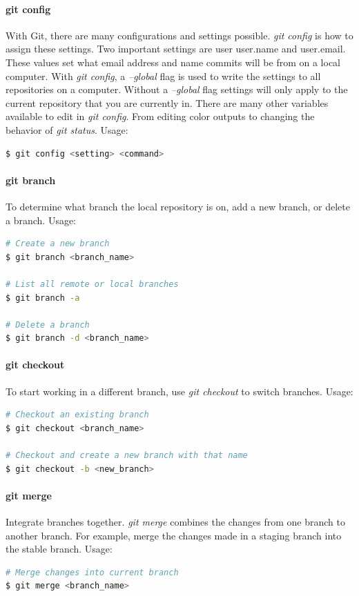 \documentclass[a4paper]{report}
\begin{document}
\paragraph{git config}
With Git, there are many configurations and settings possible. \emph{git config} is how to assign these settings. Two important settings are user user.name and user.email. These values set what email address and name commits will be from on a local computer. With \emph{git config}, a \emph{--global} flag is used to write the settings to all repositories on a computer. Without a \emph{--global} flag settings will only apply to the current repository that you are currently in.
There are many other variables available to edit in \emph{git config}. From editing color outputs to changing the behavior of \emph{git status}.
Usage:
\begin{lstlisting}[language=bash]
$ git config <setting> <command>
\end{lstlisting}

\paragraph{git branch}
To determine what branch the local repository is on, add a new branch, or delete a branch.
Usage:
\begin{lstlisting}[language=bash]
# Create a new branch
$ git branch <branch_name>

# List all remote or local branches
$ git branch -a

# Delete a branch
$ git branch -d <branch_name>
\end{lstlisting}


\paragraph{git checkout}
To start working in a different branch, use \emph{git checkout} to switch branches.
Usage:
\begin{lstlisting}[language=bash]
# Checkout an existing branch
$ git checkout <branch_name>

# Checkout and create a new branch with that name
$ git checkout -b <new_branch>
\end{lstlisting}

\paragraph{git merge}
Integrate branches together. \emph{git merge} combines the changes from one branch to another branch. For example, merge the changes made in a staging branch into the stable branch.
Usage:
\begin{lstlisting}[language=bash]
# Merge changes into current branch
$ git merge <branch_name>
\end{lstlisting}
\end{document}
